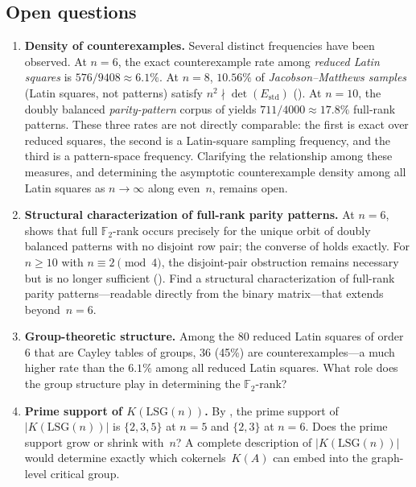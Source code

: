 \documentclass[11pt,a4paper]{article}
\newcommand{\FF}{\mathbb{F}}
\newcommand{\Estd}{E_{\mathrm{std}}}
\begin{document}
\subsection{Open questions}

\begin{enumerate}[label=\textup{(\arabic*)}]
  \item \textbf{Density of counterexamples.}
        Several distinct frequencies have been observed.
        At $n=6$, the exact counterexample rate among \emph{reduced
        Latin squares} is $576/9408 \approx 6.1\%$.
        At $n=8$, $10.56\%$ of \emph{Jacobson--Matthews
        samples} (Latin squares, not patterns) satisfy
        $n^2\nmid\det(\Estd)$ ().
        At $n=10$, the doubly balanced \emph{parity-pattern} corpus
        of  yields $711/4000\approx 17.8\%$ full-rank
        patterns.
        These three rates are not directly comparable: the first is
        exact over reduced squares, the second is a Latin-square
        sampling frequency, and the third is a pattern-space frequency.
        Clarifying the relationship among these measures, and
        determining the asymptotic counterexample density among all
        Latin squares as $n\to\infty$ along even~$n$, remains open.

  \item \textbf{Structural characterization of full-rank parity patterns.}
        At $n=6$,  shows that full $\FF_2$-rank
        occurs precisely for the unique orbit of doubly balanced
        patterns with no disjoint row pair; the converse of
         holds exactly.  For $n\ge 10$
        with $n\equiv 2\pmod{4}$, the disjoint-pair obstruction
        remains necessary but is no longer sufficient
        ().
        Find a structural characterization of full-rank parity
        patterns---readable directly from the binary matrix---that
        extends beyond~$n=6$.

  \item \textbf{Group-theoretic structure.}  Among the $80$ reduced
        Latin squares of order~$6$ that are Cayley tables of groups,
        $36$ (45\%) are counterexamples---a much higher rate
        than the $6.1\%$ among all reduced Latin squares.  What
        role does the group structure play in determining the
        $\FF_2$-rank?

  \item \textbf{Prime support of $K(\mathrm{LSG}(n))$.}
        By , the prime support of $|K(\mathrm{LSG}(n))|$
        is $\{2,3,5\}$ at $n=5$ and $\{2,3\}$ at $n=6$.
        Does the prime support grow or shrink with~$n$?
        A complete description of $|K(\mathrm{LSG}(n))|$ would
        determine exactly which cokernels~$K(A)$ can embed into
        the graph-level critical group.
\end{enumerate}
\end{document}
